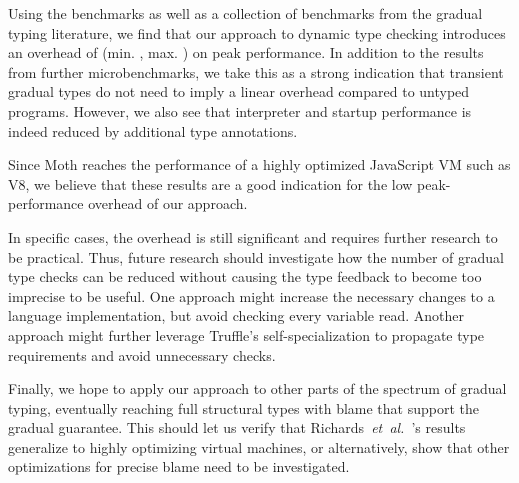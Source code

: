Using the \AWFY benchmarks as well as a collection of benchmarks from the
gradual typing literature, we find that our approach to dynamic type checking
introduces an overhead of 
\OverheadTypingGMeanP (min. \OverheadTypingMinP, max. \OverheadTypingMaxP)
on peak performance.
In addition to the results from further microbenchmarks,
we take this as a strong indication that transient gradual types do not
need to imply a linear overhead compared to untyped programs.
However, we also see that interpreter and startup performance is indeed
reduced by additional type annotations.

  
  

Since Moth reaches the performance of a
highly optimized JavaScript VM such as V8,
we believe that these results are a good indication
for the low peak-performance overhead of our approach.


In specific cases, the overhead is still significant and requires further
research to be practical. Thus, future research should investigate how the
number of gradual type checks can be reduced without causing
the type feedback to become too imprecise to be useful.
One approach might increase the necessary changes to a language implementation,
but avoid checking every variable read.
Another approach might further leverage Truffle's self-specialization
to propagate type requirements and avoid unnecessary checks.

Finally, we hope to apply our approach to other parts of the spectrum
of gradual typing, eventually reaching 
full structural types with
blame that support the gradual guarantee.  
This should let us verify that
Richards~\textit{et~al.}~\cite{Richards2017}'s results generalize to highly optimizing virtual
machines, or alternatively, show that other optimizations for precise
blame need to be investigated.

